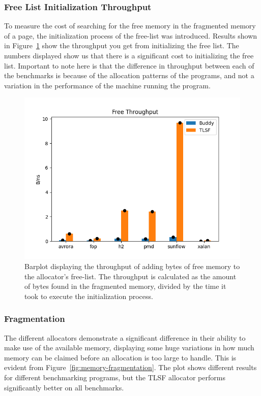 \subsubsection{Free List Initialization Throughput}

To measure the cost of searching for the free memory in the fragmented memory of a page, the initialization process of the free-list was introduced. Results shown in Figure~\ref{fig:free-list-initialization} show the throughput you get from initializing the free list. The numbers displayed show us that there is a significant cost to initializing the free list. Important to note here is that the difference in throughput between each of the benchmarks is because of the allocation patterns of the programs, and not a variation in the performance of the machine running the program. 

\begin{figure}[H]
\centering
\includegraphics[width=1\textwidth]{figures/free_throughput2.png}
\caption{Barplot displaying the throughput of adding bytes of free memory to the allocator's free-list. The throughput is calculated as the amount of bytes found in the fragmented memory, divided by the time it took to execute the initialization process.}
\label{fig:free-list-initialization}
\end{figure}

\subsubsection{Fragmentation}
\label{sec:results:frag}
The different allocators demonstrate a significant difference in their ability to make use of the available memory, displaying some huge variations in how much memory can be claimed before an allocation is too large to handle. This is evident from Figure~\ref*{fig:memory-fragmentation}. The plot shows different results for different benchmarking programs, but the TLSF allocator performs significantly better on all benchmarks.

